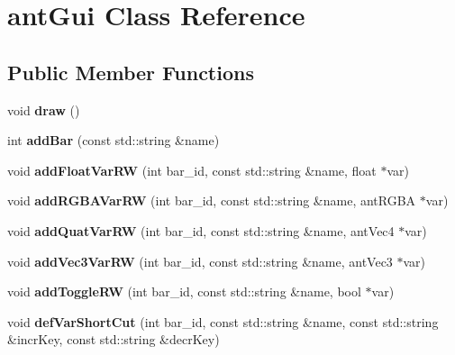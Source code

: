 \hypertarget{classant_gui}{\section{ant\+Gui Class Reference}
\label{classant_gui}
}
\subsection*{Public Member Functions}
\begin{DoxyCompactItemize}
\item 
\hypertarget{classant_gui_af5ac8a7bc1dba022721abb5bf0abacf4}{void {\bfseries draw} ()}\label{classant_gui_af5ac8a7bc1dba022721abb5bf0abacf4}

\item 
\hypertarget{classant_gui_a9adcce1fff8441b8df983579e20eba70}{int {\bfseries add\+Bar} (const std\+::string \&name)}\label{classant_gui_a9adcce1fff8441b8df983579e20eba70}

\item 
\hypertarget{classant_gui_a4414d16374700299cde9f3e557236ec4}{void {\bfseries add\+Float\+Var\+R\+W} (int bar\+\_\+id, const std\+::string \&name, float $\ast$var)}\label{classant_gui_a4414d16374700299cde9f3e557236ec4}

\item 
\hypertarget{classant_gui_a8d04951cf76d44d6f7bc93daac2ac760}{void {\bfseries add\+R\+G\+B\+A\+Var\+R\+W} (int bar\+\_\+id, const std\+::string \&name, ant\+R\+G\+B\+A $\ast$var)}\label{classant_gui_a8d04951cf76d44d6f7bc93daac2ac760}

\item 
\hypertarget{classant_gui_a9da1d56f2ddff3f65ed49161d8a20605}{void {\bfseries add\+Quat\+Var\+R\+W} (int bar\+\_\+id, const std\+::string \&name, ant\+Vec4 $\ast$var)}\label{classant_gui_a9da1d56f2ddff3f65ed49161d8a20605}

\item 
\hypertarget{classant_gui_af60ea51ab6b08de2e19f23703211409f}{void {\bfseries add\+Vec3\+Var\+R\+W} (int bar\+\_\+id, const std\+::string \&name, ant\+Vec3 $\ast$var)}\label{classant_gui_af60ea51ab6b08de2e19f23703211409f}

\item 
\hypertarget{classant_gui_a83e8eb1ff5c1c2f93e1a1fb3e3cbba6e}{void {\bfseries add\+Toggle\+R\+W} (int bar\+\_\+id, const std\+::string \&name, bool $\ast$var)}\label{classant_gui_a83e8eb1ff5c1c2f93e1a1fb3e3cbba6e}

\item 
\hypertarget{classant_gui_aa2b6c03e320d06935f88eb3ba72a9a29}{void {\bfseries def\+Var\+Short\+Cut} (int bar\+\_\+id, const std\+::string \&name, const std\+::string \&incr\+Key, const std\+::string \&decr\+Key)}\label{classant_gui_aa2b6c03e320d06935f88eb3ba72a9a29}

\end{DoxyCompactItemize}
